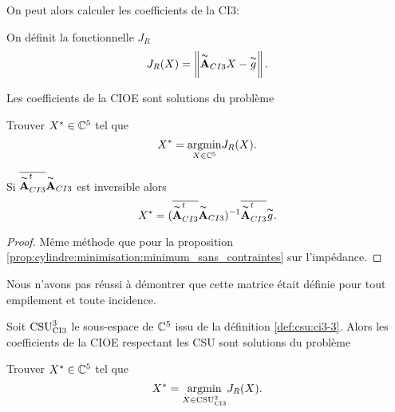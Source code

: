     On peut alors calculer les coefficients de la CI3:

    \begin{defn}
      On définit la fonctionnelle \(J_R\)
      \begin{equation*}
        J_R(X) = \norm{\tilde{\mA}_{CI3}X - \tilde{g}}.
      \end{equation*}
    \end{defn}

    \begin{defn}

      Les coefficients de la CIOE sont solutions du problème

      Trouver \(X^* \in \CC^5\) tel que
      \begin{equation*}
        X^* = \argmin{X\in \CC^5} J_R(X).
      \end{equation*}
    \end{defn}

    \begin{prop}
      Si \(\conj{\tilde{\mA}_{CI3}^t}\tilde{\mA}_{CI3}\) est inversible alors
      \begin{equation*}
        X^* = (\conj{\tilde{\mA}_{CI3}^t}\tilde{\mA}_{CI3})^{-1}\conj{\tilde{\mA}_{CI3}^t}\tilde{g}.
      \end{equation*}
    \end{prop}
    \begin{proof}
      Même méthode que pour la proposition \ref{prop:cylindre:minimisation:minimum_sans_contraintes} sur l'impédance.
    \end{proof}

    Nous n'avons pas réussi à démontrer que cette matrice était définie pour tout empilement et toute incidence.

    \begin{defn}

      Soit \(\CSU[3]{CI3}\) le sous-espace de \(\CC^5\) issu de la définition \ref{def:csu:ci3-3}.
      Alors les coefficients de la CIOE respectant les CSU sont solutions du problème

      Trouver \(X^* \in \CC^5\) tel que
      \begin{equation*}
        X^* = \argmin{X\in \CSU[3]{CI3}} J_R(X).
      \end{equation*}
    \end{defn}
